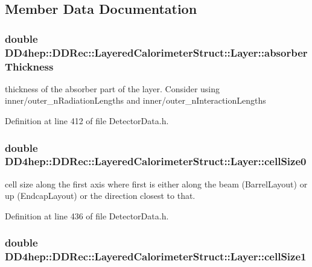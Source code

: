 \subsection{Member Data Documentation}
\hypertarget{struct_d_d4hep_1_1_d_d_rec_1_1_layered_calorimeter_struct_1_1_layer_ad774498891dc9332c4edb5af822edca0}{
\subsubsection[{absorberThickness}]{\setlength{\rightskip}{0pt plus 5cm}double {\bf DD4hep::DDRec::LayeredCalorimeterStruct::Layer::absorberThickness}}}
\label{struct_d_d4hep_1_1_d_d_rec_1_1_layered_calorimeter_struct_1_1_layer_ad774498891dc9332c4edb5af822edca0}


thickness of the absorber part of the layer. Consider using inner/outer\_\-nRadiationLengths and inner/outer\_\-nInteractionLengths 

Definition at line 412 of file DetectorData.h.\hypertarget{struct_d_d4hep_1_1_d_d_rec_1_1_layered_calorimeter_struct_1_1_layer_a648ec7174a8858e289b87214835d2fbf}{
\subsubsection[{cellSize0}]{\setlength{\rightskip}{0pt plus 5cm}double {\bf DD4hep::DDRec::LayeredCalorimeterStruct::Layer::cellSize0}}}
\label{struct_d_d4hep_1_1_d_d_rec_1_1_layered_calorimeter_struct_1_1_layer_a648ec7174a8858e289b87214835d2fbf}


cell size along the first axis where first is either along the beam (BarrelLayout) or up (EndcapLayout) or the direction closest to that. 

Definition at line 436 of file DetectorData.h.\hypertarget{struct_d_d4hep_1_1_d_d_rec_1_1_layered_calorimeter_struct_1_1_layer_afbf7fe6d692de53e93a654dbdd8a866a}{
\subsubsection[{cellSize1}]{\setlength{\rightskip}{0pt plus 5cm}double {\bf DD4hep::DDRec::LayeredCalorimeterStruct::Layer::cellSize1}}}
\label{struct_d_d4hep_1_1_d_d_rec_1_1_layered_calorimeter_struct_1_1_layer_afbf7fe6d692de53e93a654dbdd8a866a}


